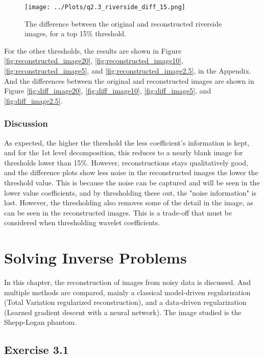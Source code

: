 \documentclass[12pt]{report} %
\begin{document}
\begin{figure}[htbp]
    \centering
    \texttt{[image: ../Plots/q2.3\_riverside\_diff\_15.png]}
    \caption{The difference between the original and reconstructed riverside images, for a top 15\% threshold.}
    \label{fig:diff_image15}
\end{figure}


For the other thresholds, the results are shown in Figure \ref{fig:reconstructed_image20}, \ref{fig:reconstructed_image10},  \ref{fig:reconstructed_image5}, and \ref{fig:reconstructed_image2.5}, in the Appendix. And the differences between the original and reconstructed images are shown in Figure \ref{fig:diff_image20}, \ref{fig:diff_image10}, \ref{fig:diff_image5}, and \ref{fig:diff_image2.5}.


\subsection{Discussion}

As expected, the higher the threshold the less coefficient's information is kept, and for the 1st level decomposition, this reduces to a nearly blank image for thresholds lower than 15\%. However, reconstructions stays qualitatively good, and the difference plots show less noise in the reconstructed images the lower the threshold value. This is because the noise can be captured and will be seen in the lower value coefficients, and by thresholding these out, the "noise information" is lost. However, the thresholding also removes some of the detail in the image, as can be seen in the reconstructed images. This is a trade-off that must be considered when thresholding wavelet coefficients.

\chapter{Solving Inverse Problems}

In this chapter, the reconstruction of images from noisy data is discussed. And multiple methods are compared, mainly a classical model-driven regularization (Total Variation regularized reconstruction), and a data-driven regularization (Learned gradient descent with a neural network). The image studied is the Shepp-Logan phantom.

\section{Exercise 3.1}
\end{document}

